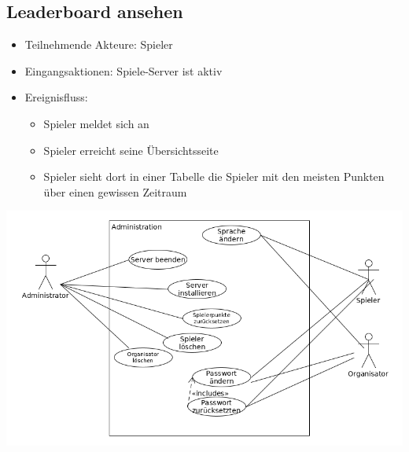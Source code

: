 \documentclass[a4paper]{scrreprt}
\begin{document}
    \subsection{Leaderboard ansehen}
    \begin{itemize}
        \item Teilnehmende Akteure: \Gls{Spieler}
        \item Eingangsaktionen: Spiele-Server ist aktiv
        \item Ereignisfluss:
        \begin{itemize}
            \item \Gls{Spieler} meldet sich an
            \item \Gls{Spieler} erreicht seine Übersichtsseite
            \item \Gls{Spieler} sieht dort in einer Tabelle die \Gls{Spieler} mit den meisten Punkten über einen gewissen Zeitraum
        \end{itemize}
    \end{itemize}
    \newpage
    \includegraphics[width=\textwidth]{uml/export/Administration.png}
\end{document}
